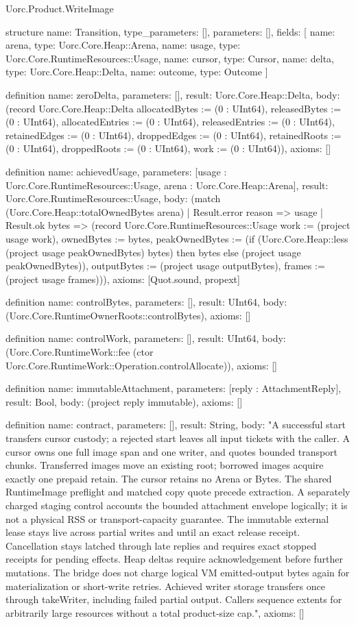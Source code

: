 \begin{lexlean}{Uorc.Product.WriteImage}
\begin{semanticmodule}
structure{
  name: Transition,
  type_parameters: [],
  parameters: [],
  fields: [
    {name: arena, type: Uorc.Core.Heap::Arena},
    {name: usage, type: Uorc.Core.RuntimeResources::Usage},
    {name: cursor, type: Cursor},
    {name: delta, type: Uorc.Core.Heap::Delta},
    {name: outcome, type: Outcome}
  ]
}

definition{
  name: zeroDelta,
  parameters: [],
  result: Uorc.Core.Heap::Delta,
  body: (record Uorc.Core.Heap::Delta {allocatedBytes := (0 : UInt64), releasedBytes := (0 : UInt64), allocatedEntries := (0 : UInt64), releasedEntries := (0 : UInt64), retainedEdges := (0 : UInt64), droppedEdges := (0 : UInt64), retainedRoots := (0 : UInt64), droppedRoots := (0 : UInt64), work := (0 : UInt64)}),
  axioms: []
}

definition{
  name: achievedUsage,
  parameters: [usage : Uorc.Core.RuntimeResources::Usage, arena : Uorc.Core.Heap::Arena],
  result: Uorc.Core.RuntimeResources::Usage,
  body: (match (Uorc.Core.Heap::totalOwnedBytes arena)
    | Result.error reason => usage
    | Result.ok bytes => (record Uorc.Core.RuntimeResources::Usage {work := (project usage work), ownedBytes := bytes, peakOwnedBytes := (if (Uorc.Core.Heap::less (project usage peakOwnedBytes) bytes) then bytes else (project usage peakOwnedBytes)), outputBytes := (project usage outputBytes), frames := (project usage frames)})),
  axioms: [Quot.sound, propext]
}

definition{
  name: controlBytes,
  parameters: [],
  result: UInt64,
  body: (Uorc.Core.RuntimeOwnerRoots::controlBytes),
  axioms: []
}

definition{
  name: controlWork,
  parameters: [],
  result: UInt64,
  body: (Uorc.Core.RuntimeWork::fee (ctor Uorc.Core.RuntimeWork::Operation.controlAllocate)),
  axioms: []
}

definition{
  name: immutableAttachment,
  parameters: [reply : AttachmentReply],
  result: Bool,
  body: (project reply immutable),
  axioms: []
}

definition{
  name: contract,
  parameters: [],
  result: String,
  body: "A successful start transfers cursor custody; a rejected start leaves all input tickets with the caller. A cursor owns one full image span and one writer, and quotes bounded transport chunks. Transferred images move an existing root; borrowed images acquire exactly one prepaid retain. The cursor retains no Arena or Bytes. The shared RuntimeImage preflight and matched copy quote precede extraction. A separately charged staging control accounts the bounded attachment envelope logically; it is not a physical RSS or transport-capacity guarantee. The immutable external lease stays live across partial writes and until an exact release receipt. Cancellation stays latched through late replies and requires exact stopped receipts for pending effects. Heap deltas require acknowledgement before further mutations. The bridge does not charge logical VM emitted-output bytes again for materialization or short-write retries. Achieved writer storage transfers once through takeWriter, including failed partial output. Callers sequence extents for arbitrarily large resources without a total product-size cap.",
  axioms: []
}


\end{semanticmodule}
\end{lexlean}
